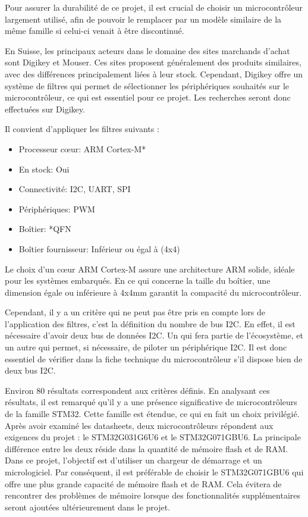 Pour assurer la durabilité de ce projet, il est crucial de choisir un microcontrôleur largement utilisé, afin de pouvoir le remplacer par un modèle similaire de la même famille si celui-ci venait à être discontinué.

En Suisse, les principaux acteurs dans le domaine des sites marchands d'achat sont Digikey et Mouser.
Ces sites proposent généralement des produits similaires, avec des différences principalement liées à leur stock.
Cependant, Digikey offre un système de filtres qui permet de sélectionner les périphériques souhaités sur le microcontrôleur, ce qui est essentiel pour ce projet.
Les recherches seront donc effectuées sur Digikey.

Il convient d'appliquer les filtres suivants :

\begin{itemize}
    \item Processeur c\oe{}ur: ARM Cortex-M*
    \item En stock: Oui
    \item Connectivité: I2C, UART, SPI
    \item Périphériques: PWM
    \item Boîtier: *QFN
    \item Boîtier fournisseur: Inférieur ou égal à (4x4)
\end{itemize}

Le choix d'un c\oe{}ur ARM Cortex-M assure une architecture ARM solide, idéale pour les systèmes embarqués.
En ce qui concerne la taille du boîtier, une dimension égale ou inférieure à 4x4mm garantit la compacité du microcontrôleur.

Cependant, il y a un critère qui ne peut pas être pris en compte lors de l'application des filtres, c'est la définition du nombre de bus I2C.
En effet, il est nécessaire d'avoir deux bus de données I2C.
Un qui fera partie de l'écosystème, et un autre qui permet, si nécessaire, de piloter un périphérique I2C.
Il est donc essentiel de vérifier dans la fiche technique du microcontrôleur s'il dispose bien de deux bus I2C.

Environ 80 résultats correspondent aux critères définis.
En analysant ces résultats, il est remarqué qu'il y a une présence significative de microcontrôleurs de la famille STM32.
Cette famille est étendue, ce qui en fait un choix privilégié.
Après avoir examiné les datasheets, deux microcontrôleurs répondent aux exigences du projet : le STM32G031G6U6 et le STM32G071GBU6.
La principale différence entre les deux réside dans la quantité de mémoire flash et de RAM.
Dans ce projet, l'objectif est d'utiliser un chargeur de démarrage et un micrologiciel.
Par conséquent, il est préférable de choisir le STM32G071GBU6 qui offre une plus grande capacité de mémoire flash et de RAM.
Cela évitera de rencontrer des problèmes de mémoire lorsque des fonctionnalités supplémentaires seront ajoutées ultérieurement dans le projet.

